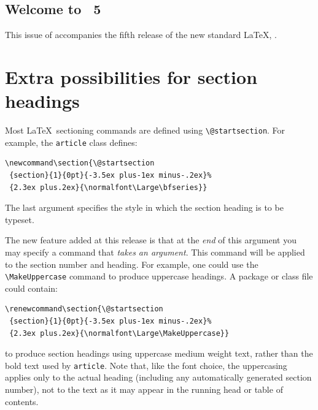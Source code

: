 \documentclass{ltnews}
\providecommand\cls[1]{\texttt{#1}}
\begin{document}
\maketitle

\subsection{Welcome to \LaTeXNews~5}
This issue of \emph{\LaTeXNews} accompanies the fifth release of the
new standard \LaTeX{}, \LaTeXe.

\section{Extra possibilities for section headings}
Most \LaTeX\ sectioning commands are defined using
\verb|\@startsection|.
For example, the \cls{article} class defines:
\begin{small}
\begin{verbatim}
\newcommand\section{\@startsection
 {section}{1}{0pt}{-3.5ex plus-1ex minus-.2ex}%
 {2.3ex plus.2ex}{\normalfont\Large\bfseries}}
\end{verbatim}
\end{small}
The last argument specifies the style in which the section heading is
to be typeset.

The new feature added at this release is that at the \emph{end} of
this argument you may specify a command that \emph{takes an argument}.
This command will be applied to the section number and heading.
For example, one could use the \verb|\MakeUppercase| command to
produce uppercase headings. A package or class file could contain:
\begin{small}
\begin{verbatim}
\renewcommand\section{\@startsection
 {section}{1}{0pt}{-3.5ex plus-1ex minus-.2ex}%
 {2.3ex plus.2ex}{\normalfont\Large\MakeUppercase}}
\end{verbatim}
\end{small}
to produce section headings using uppercase medium weight text, rather
than the bold text used by \cls{article}. Note that, like the font
choice, the uppercasing applies only to the actual heading (including
any automatically generated section number), not to the text as it may
appear in the running head or table of contents.
\end{document}
